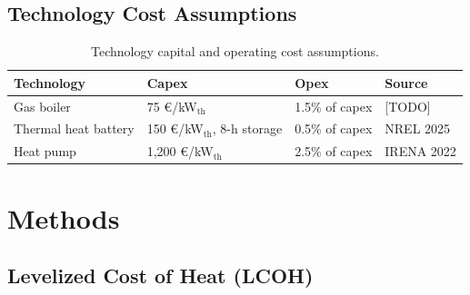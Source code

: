 \documentclass[12pt, a4paper]{article}
\begin{document}
\subsection{Technology Cost Assumptions}


\begin{table}[H]
  \centering
  \caption{Technology capital and operating cost assumptions.}
  \label{tab:tech_costs}
  \begin{tabular}{llll}
    \toprule
    \textbf{Technology} & \textbf{Capex} & \textbf{Opex} & \textbf{Source} \\
    \midrule
    Gas boiler      & 75 \euro/kW$_\text{th}$                  & 1.5\% of capex & [TODO] \\
    Thermal heat battery & 150 \euro/kW$_\text{th}$, 8-h storage & 0.5\% of capex & NREL 2025 \citep{wikoff2025} \\
    Heat pump       & 1{,}200 \euro/kW$_\text{th}$              & 2.5\% of capex & IRENA 2022 \citep{irena2022hp} \\
    \bottomrule
  \end{tabular}
\end{table}

\section{Methods}
\label{sec:methods}

\subsection{Levelized Cost of Heat (LCOH)}
%
%
%
\end{document}
